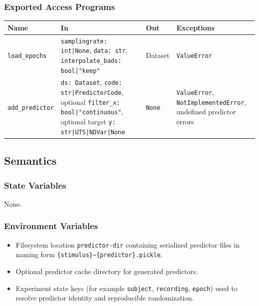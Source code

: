 \documentclass[12pt, titlepage]{article}
\begin{document}
\subsubsection{Exported Access Programs}

\begin{center}
\begin{tabular}{p{3cm} p{4cm} p{4cm} p{3cm}}
\hline
\textbf{Name} & \textbf{In} & \textbf{Out} & \textbf{Exceptions} \\
\hline
\texttt{load\_epochs} &
\texttt{samplingrate: int|None}, \texttt{data: str}, \texttt{interpolate\_bads: bool|"keep"} &
Dataset &
\texttt{ValueError} \\

\texttt{add\_predictor} &
\texttt{ds: Dataset}, \texttt{code: str|PredictorCode}, optional \texttt{filter\_x: bool|"continuous"}, optional target \texttt{y: str|UTS|NDVar|None} &
\texttt{None} &
\texttt{ValueError}, \texttt{NotImplementedError}, undefined predictor errors \\
\hline
\end{tabular}
\end{center}

\subsection{Semantics}

\subsubsection{State Variables}

None. 

\subsubsection{Environment Variables}

\begin{itemize}
\item Filesystem location \texttt{predictor-dir} containing serialized predictor
files in naming form \texttt{\{stimulus\}\textasciitilde\{predictor\}.pickle}.
\item Optional predictor cache directory for generated predictors.
\item Experiment state keys (for example \texttt{subject}, \texttt{recording},
\texttt{epoch}) used to resolve predictor identity and reproducible randomization.
\end{itemize}
\end{document}
